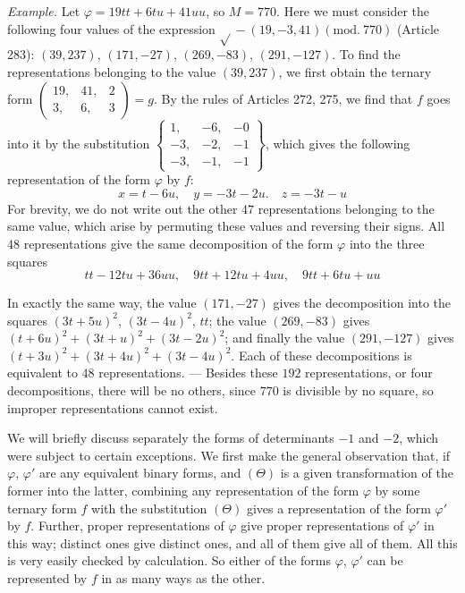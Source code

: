 \textit{Example.} Let $\varphi=19tt+6tu+41uu$, so $M=770$. Here we must consider the
following four values of the expression $\surd{}-(19,\allowbreak -3,\allowbreak 41)(\mathrm{mod.}\ 770)$ (Article 283): $(39,237)$,
$(171,-27)$, $(269,-83)$, $(291,-127)$. To find the representations belonging to the
value $(39,237)$, we first obtain the ternary form $\left(\begin{smallmatrix}19,&41,&2\\3,&6,&3\end{smallmatrix}\right)=g$. By the rules
of Articles 272, 275, we find that $f$ goes into it by the substitution
$\left\{\begin{smallmatrix}1,&-6,&-0\\-3,&-2,&-1\\-3,&-1,&-1\end{smallmatrix}\right\}$, which gives the following representation of the form $\varphi$
by $f$:
\[
x=t-6u,\quad y=-3t-2u.\quad z=-3t-u
\]
For brevity, we do not write out the other $47$ representations
belonging to the same value, which arise by permuting these values and
reversing their signs. All $48$ representations give the same
decomposition of the form $\varphi$ into the three squares
\[
tt-12tu+36uu,\quad 9tt+12tu+4uu,\quad 9tt+6tu+uu
\]

In exactly the same way, the value $(171,-27)$ gives the decomposition into
the squares $(3t+5u)^2$, $(3t-4u)^2$, $tt$; the value $(269,-83)$ gives $(t+6u)^2+(3t+u)^2+(3t-2u)^2$;
and finally the value $(291,-127)$ gives $(t+3u)^2+(3t+4u)^2+(3t-4u)^2$. Each of these decompositions
is equivalent to $48$ representations. --- Besides these $192$
representations, or four decompositions, there will be no others, since
$770$ is divisible by no square, so improper representations cannot exist.

We will briefly discuss separately the forms of determinants $-1$
and $-2$, which were subject to certain exceptions. We first make
the general observation that, if $\varphi$, $\varphi'$ are any equivalent
binary forms, and $(\Theta)$ is a given transformation of the former into
the latter, combining any representation of the form $\varphi$ by some
ternary form $f$ with the substitution $(\Theta)$ gives a representation
of the form $\varphi'$ by $f$. Further, proper representations of
$\varphi$ give proper representations of $\varphi'$ in this way; distinct
ones give distinct ones, and all of them give all of them. All this is
very easily checked by calculation. So either of the forms $\varphi$,
$\varphi'$ can be represented by $f$ in as many ways as the other.

